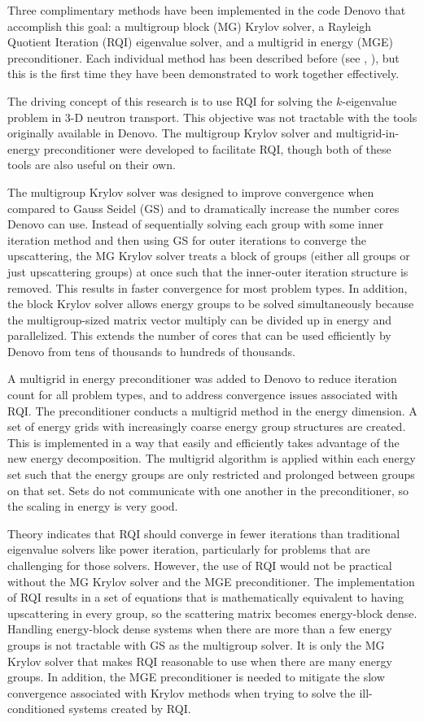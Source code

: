 \documentclass[preprint,12pt]{elsarticle}
\begin{document}
Three complimentary methods have been implemented in the code Denovo \cite{Evans2010} that accomplish this goal: a multigroup block (MG) Krylov solver, a Rayleigh Quotient Iteration (RQI) eigenvalue solver, and a multigrid in energy (MGE) preconditioner. Each individual method has been described before (see \cite{Slaybaugh2012}, \cite{Slaybaugh2013}), but this is the first time they have been demonstrated to work together effectively.

The driving concept of this research is to use RQI for solving the $k$-eigenvalue problem in 3-D neutron transport. This objective was not tractable with the tools originally available in Denovo. The multigroup Krylov solver and multigrid-in-energy preconditioner were developed to facilitate RQI, though both of these tools are also useful on their own. 

The multigroup Krylov solver was designed to improve convergence when compared to Gauss Seidel (GS) and to dramatically increase the number cores Denovo can use. Instead of sequentially solving each group with some inner iteration method and then using GS for outer iterations to converge the upscattering, the MG Krylov solver treats a block of groups (either all groups or just upscattering groups) at once such that the inner-outer iteration structure is removed. This results in faster convergence for most problem types. In addition, the block Krylov solver allows energy groups to be solved simultaneously because the multigroup-sized matrix vector multiply can be divided up in energy and parallelized. This extends the number of cores that can be used efficiently by Denovo from tens of thousands to hundreds of thousands. 

A multigrid in energy preconditioner was added to Denovo to reduce iteration count for all problem types, and to address convergence issues associated with RQI. The  preconditioner conducts a multigrid method in the energy dimension. A set of energy grids with increasingly coarse energy group structures are created. This is implemented in a way that easily and efficiently takes advantage of the new energy decomposition. The multigrid algorithm is applied within each energy set such that the energy groups are only restricted and prolonged between groups on that set. Sets do not communicate with one another in the preconditioner, so the scaling in energy is very good. 

Theory indicates that RQI should converge in fewer iterations than traditional eigenvalue solvers like power iteration, particularly for problems that are challenging for those solvers. However, the use of RQI would not be practical without the MG Krylov solver and the MGE preconditioner. The implementation of RQI results in a set of equations that is mathematically equivalent to having upscattering in every group, so the scattering matrix becomes energy-block dense. Handling energy-block dense systems when there are more than a few energy groups is not tractable with GS as the multigroup solver. It is only the MG Krylov solver that makes RQI reasonable to use when there are many energy groups. In addition, the MGE preconditioner is needed to mitigate the slow convergence associated with Krylov methods when trying to solve the ill-conditioned systems created by RQI. 
\end{document}
